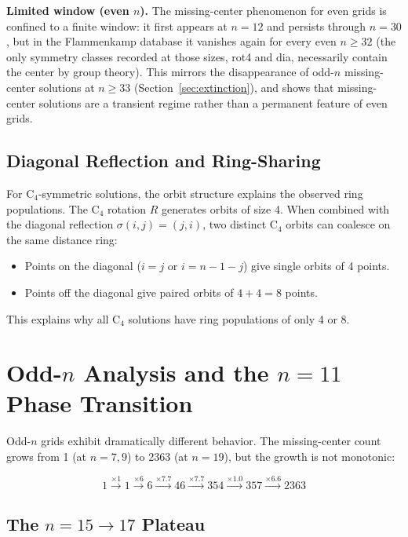 \documentclass[11pt,a4paper]{article}
\theoremstyle{plain}
\theoremstyle{definition}
\begin{document}
\noindent\textbf{Limited window (even $n$).} The missing-center phenomenon for even grids is confined to a finite window: it first appears at $n=12$ and persists through $n=30$, but in the Flammenkamp database it vanishes again for every even $n\ge 32$ (the only symmetry classes recorded at those sizes, rot4 and dia, necessarily contain the center by group theory). This mirrors the disappearance of odd-$n$ missing-center solutions at $n\ge 33$ (Section~\ref{sec:extinction}), and shows that missing-center solutions are a transient regime rather than a permanent feature of even grids.

\subsection{Diagonal Reflection and Ring-Sharing}

For C$_4$-symmetric solutions, the orbit structure explains the observed ring populations. The C$_4$ rotation $R$ generates orbits of size 4. When combined with the diagonal reflection $\sigma(i,j)=(j,i)$, two distinct C$_4$ orbits can coalesce on the same distance ring:

\begin{itemize}
\item Points on the diagonal ($i=j$ or $i=n-1-j$) give single orbits of 4 points.
\item Points off the diagonal give paired orbits of $4+4=8$ points.
\end{itemize}

This explains why all C$_4$ solutions have ring populations of only 4 or 8.

\section{Odd-$n$ Analysis and the $n=11$ Phase Transition}
\label{sec:odd}

Odd-$n$ grids exhibit dramatically different behavior. The missing-center count grows from 1 (at $n=7,9$) to 2363 (at $n=19$), but the growth is not monotonic:

\begin{equation}
1 \xrightarrow{\times1} 1 \xrightarrow{\times6} 6 \xrightarrow{\times7.7} 46 \xrightarrow{\times7.7} 354 \xrightarrow{\times1.0} 357 \xrightarrow{\times6.6} 2363
\end{equation}

\subsection{The $n=15\to17$ Plateau}
\end{document}
